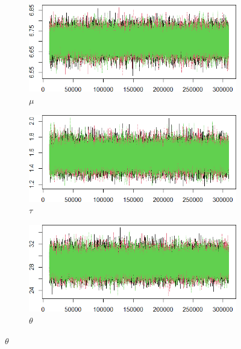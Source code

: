 \documentclass{Class/julia}
\begin{document}
\begin{figure}[!ht]
    \centering
    \caption{Trace Plots After Thinning}
    \label{fig:13}
    \begin{subfigure}{0.45\textwidth}
        \centering
        \includegraphics[width=\textwidth]{itamtplcost/trace_after_thinning_mu.png}
        \caption{\( \mu \)}
    \end{subfigure}
    \hfill
    \begin{subfigure}{0.45\textwidth}
        \centering
        \includegraphics[width=\textwidth]{itamtplcost/trace_after_thinning_tau.png}
        \caption{\( \tau \)}
    \end{subfigure}

    \vspace{1em}

    \begin{subfigure}{0.45\textwidth}
        \centering
        \includegraphics[width=\textwidth]{itamtplcost/trace_after_thinning_theta.png}
        \caption{\( \theta \)}
    \end{subfigure}
\end{figure}
\end{document}
